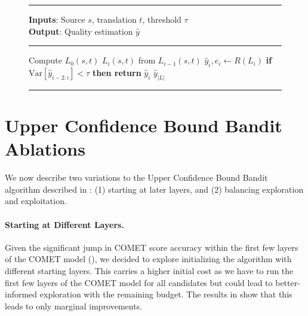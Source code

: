 \begin{figure}[ht!]
{
\small
\hrule
\vspace{1mm}
\textbf{Inputs}: Source $s$, translation $t$, threshold $\tau$ \\
\textbf{Output}: Quality estimation $\hat{y}$ 
\vspace{1mm}
\hrule
\vspace{1mm}
\begin{algorithmic}[1]

\State Compute $L_0(s, t)$
    $L_i(s,t)$ from $L_{i-1}(s,t)$ 
    \State $\hat{y}_i, \hat{e}_i \gets R(L_i)$ 
    \State \textbf{if} $\mathrm{Var}[\hat{y}_{i-2:i}]{<} \tau$ \textbf{then return} $\hat{y}_i$
\EndFor
\State \Return  $\hat{y}_{|L|}$ 
\end{algorithmic}
}
\vspace{1mm}
\hrule
\vspace{1mm}


\label{alg:variance_algorithm}

\end{figure}






\section{Upper Confidence Bound Bandit Ablations}
\label{sec:bandit_ablations}

We now describe two variations to the Upper Confidence Bound Bandit algorithm described in : (1) starting at later layers, and (2) balancing exploration and exploitation.

\paragraph{Starting at Different Layers.}
Given the significant jump in COMET score accuracy within the first few layers of the COMET model (), we decided to explore initializing the algorithm with different starting layers. This carries a higher initial cost as we have to run the first few layers of the COMET model for all candidates but could lead to better-informed exploration with the remaining budget.
The results in  show that this leads to only marginal improvements.
